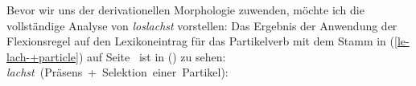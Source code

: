 Bevor wir uns der derivationellen Morphologie zuwenden, möchte ich die vollständige
Analyse von \emph{loslachst} vorstellen:
Das Ergebnis der Anwendung der Flexionsregel auf den Lexikoneintrag
für das Partikelverb mit dem Stamm 
in (\ref{le-lach-+particle}) auf Seite~\pageref{le-lach-+particle} ist in () zu sehen:
%
\newsavebox{\boxxcompvier}
\eas
\label{le-lachst-+particle}
\mbox{\emph{lachst} (Präsens + Selektion einer Partikel):}\\
\zs

